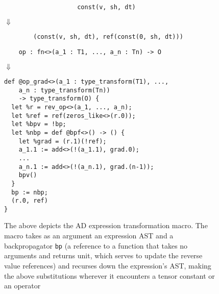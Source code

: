 \begin{figure}
  \begin{center}
    \begin{minipage}{0.5\textwidth}
      \begin{verbatim}
                    const(v, sh, dt)
      \end{verbatim}
    \end{minipage}
  \end{center}
  $\Downarrow$
  \begin{center}
    \begin{minipage}{0.5\textwidth}
      \begin{verbatim}
        (const(v, sh, dt), ref(const(0, sh, dt)))
      \end{verbatim}
    \end{minipage}
  \end{center}
  \vspace{0.25cm}
  \begin{center}
    \begin{minipage}{0.5\textwidth}
      \begin{verbatim}
    op : fn<>(a_1 : T1, ..., a_n : Tn) -> O
      \end{verbatim}
    \end{minipage}
  \end{center}
  $\Downarrow$
  \begin{center}
    \begin{minipage}{0.5\textwidth}
      \begin{verbatim}
def @op_grad<>(a_1 : type_transform(T1), ...,
    a_n : type_transform(Tn))
    -> type_transform(O) {
  let %r = rev_op<>(a_1, ..., a_n);
  let %ref = ref(zeros_like<>(r.0));
  let %bpv = !bp;
  let %nbp = def @bpf<>() -> () {
    let %grad = (r.1)(!ref);
    a_1.1 := add<>(!(a_1.1), grad.0);
    ...
    a_n.1 := add<>(!(a_n.1), grad.(n-1));
    bpv()
  }
  bp := nbp;
  (r.0, ref)
}
      \end{verbatim}
    \end{minipage}
  \end{center}
  \caption{
    The above depicts the AD expression
      transformation macro.
    The macro takes as an
      argument an expression AST and a backpropagator
      \texttt{bp}
      (a reference to a function that takes no
      arguments and returns unit,
      which serves to update the reverse value references)
      and recurses down the expression's AST,
      making the above substitutions wherever
      it encounters a tensor constant or an operator
}
\end{figure}
